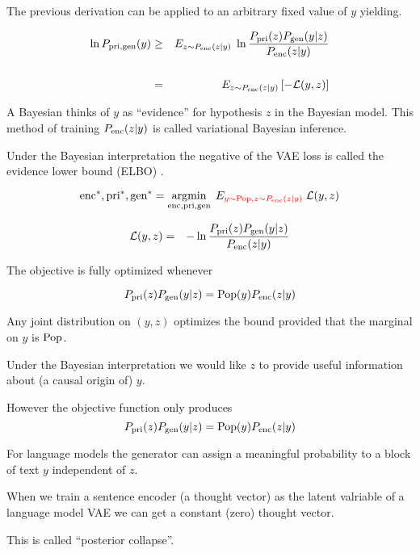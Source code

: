 {

The previous derivation can be applied to an arbitrary fixed value of $y$ yielding.

\begin{eqnarray*}
\ln P_{\mathrm{pri},\mathrm{gen}}(y) & \geq  & E_{z \sim P_{\mathrm{enc}}(z|y)}\; \ln \frac{P_{\mathrm{pri}}(z)P_{\mathrm{gen}}(y|z)}{P_{\mathrm{enc}}(z|y)} \\
\\
& = & E_{z \sim P_{\mathrm{enc}}(z|y)}\left[-{\cal L}(y,z)\right]
\end{eqnarray*}

\vfill
A Bayesian thinks of $y$ as ``evidence'' for hypothesis $z$ in the Bayesian model.  This method of training $P_{\mathrm{enc}}(z|y)$ is called {\color{red} variational Bayesian inference}.

\vfill
Under the Bayesian interpretation the negative of the VAE loss is called {\color{red} the evidence lower bound (ELBO)}    .


$$\mathrm{enc}^*,\mathrm{pri}^*,\mathrm{gen}^* = \operatorname*{argmin}_{\mathrm{enc},\mathrm{pri},\mathrm{gen}}\;E_{\color{red} y \sim \mathrm{Pop},z\sim P_{\mathrm{enc}}(z|y)}\;{\cal L}(y,z)$$

\vfill
\begin{eqnarray*}
{\cal L}(y,z) & = & - \ln \frac{P_{\mathrm{pri}}(z)P_{\mathrm{gen}}(y|z)}{P_{\mathrm{enc}}(z|y)}
\end{eqnarray*}

\vfill
The objective is fully optimized whenever

\vfill
{\color{red} $$P_{\mathrm{pri}}(z)P_{\mathrm{gen}}(y|z) = \mathrm{Pop}(y)P_{\mathrm{enc}}(z|y)$$}

\vfill
Any joint distribution on $(y,z)$ optimizes the bound provided that the marginal on $y$ is $\mathrm{Pop}$.


Under the Bayesian interpretation we would like $z$ to provide useful information about (a causal origin of) $y$.

\vfill
However the objective function only produces
$$P_{\mathrm{pri}}(z)P_{\mathrm{gen}}(y|z) = \mathrm{Pop}(y)P_{\mathrm{enc}}(z|y)$$

\vfill
For language models the generator can assign a meaningful probability to a block of text $y$ independent of $z$.

\vfill
When we train a sentence encoder (a thought vector) as the latent valriable of a language model VAE we can get a constant (zero) thought vector.

\vfill
This is called ``posterior collapse''.

}
